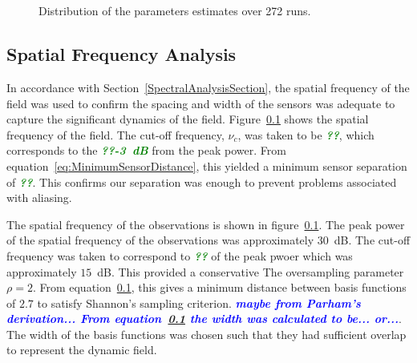 \documentclass[12pt]{iopart}
\newcommand{\todo}[1]{\textsf{\emph{\textbf{\textcolor{blue}{#1}}}}}
\newcommand{\omg}[1]{\textsf{\emph{\textbf{\textcolor{green}{#1}}}}}
\begin{document}
\begin{figure}[th]
\\
\\
\caption{Distribution of the parameters estimates over 272
runs.}
\label{fig:Parameters}
\end{figure}
\subsection{Spatial Frequency Analysis} In accordance with Section~\ref{SpectralAnalysisSection}, the spatial frequency of the field was used to confirm the spacing and width of the sensors was adequate to capture the significant dynamics of the field. Figure~\ref{} shows the spatial frequency of the field. The cut-off frequency, $\nu_c$, was taken to be \omg{??}, which corresponds to the \omg{??-3~dB} from the peak power. From equation~\ref{eq:MinimumSensorDistance}, this yielded a minimum sensor separation of \omg{??}. This confirms our separation was enough to prevent problems associated with aliasing.

The spatial frequency of the observations is shown in figure~\ref{}. The peak power of the spatial frequency of the observations was approximately $30$~dB. The cut-off frequency was taken to correspond to \omg{??} of the peak pwoer which was approximately $15$~dB. This provided a conservative The oversampling parameter $\rho=2$. From equation~\ref{}, this gives a minimum distance between basis functions of $2.7$ to satisfy Shannon's sampling criterion. \todo{maybe from Parham's derivation... From equation~\ref{} the width was calculated to be... or...}. The width of the basis functions was chosen such that they had sufficient overlap to represent the dynamic field.
\end{document}
